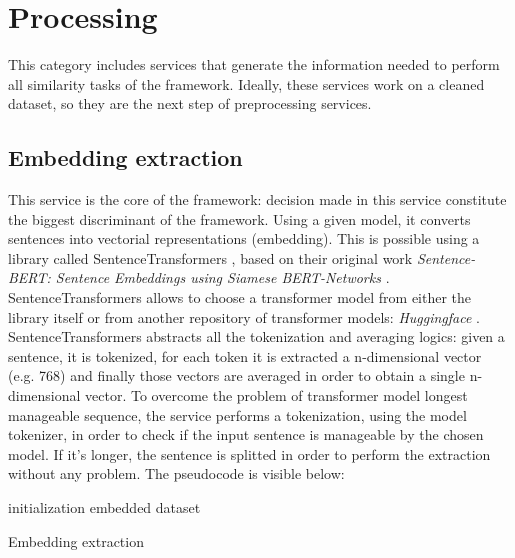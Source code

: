 \documentclass[\main/main.tex]{subfiles}
\begin{document}
\section{Processing}
This category includes services that generate the information needed to perform all similarity tasks of the framework. Ideally, these services work on a cleaned dataset, so they are the next step of preprocessing services. 
\subsection{Embedding extraction}
This service is the core of the framework: decision made in this service constitute the biggest discriminant of the framework. Using a given model, it converts sentences into vectorial representations (embedding). This is possible using a library called SentenceTransformers \cite{sbert}, based on their original work \textit{Sentence-BERT: Sentence Embeddings using Siamese BERT-Networks} \cite{reimers2019sentencebert}. SentenceTransformers allows to choose a transformer model from either the library itself or from another repository of transformer models: \textit{Huggingface} \cite{huggingface}. SentenceTransformers abstracts all the tokenization and averaging logics: given a sentence, it is tokenized, for each token it is extracted a n-dimensional vector (e.g. 768) and finally those vectors are averaged in order to obtain a single n-dimensional vector. To overcome the problem of transformer model longest manageable sequence, the service performs a tokenization, using the model tokenizer, in order to check if the input sentence is manageable by the chosen model. If it's longer, the sentence is splitted in order to perform the extraction without any problem. The pseudocode is visible below:
\begin{center}
    \begin{algorithm}[H]
     initialization
     \Return embedded dataset
     \caption{Embedding extraction}
    \end{algorithm}
\end{center}
\end{document}
